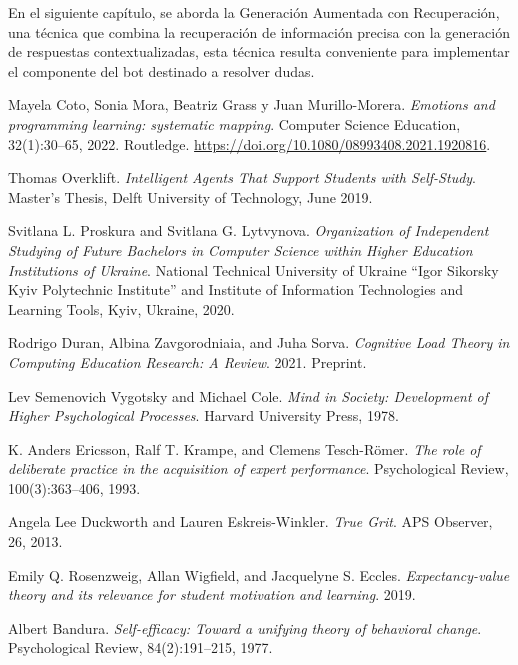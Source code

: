 \documentclass{article}
\begin{document}
En el siguiente capítulo, se aborda la Generación Aumentada con Recuperación, una técnica que combina la recuperación de información precisa con la generación de respuestas contextualizadas, esta técnica resulta conveniente para implementar el componente del bot destinado a resolver dudas.

\begin{thebibliography}{99}

Mayela Coto, Sonia Mora, Beatriz Grass y Juan Murillo-Morera. 
\textit{Emotions and programming learning: systematic mapping}. 
Computer Science Education, 32(1):30--65, 2022. 
Routledge. 
\url{https://doi.org/10.1080/08993408.2021.1920816}.

Thomas Overklift. 
\textit{Intelligent Agents That Support Students with Self-Study}. 
Master's Thesis, Delft University of Technology, June 2019.

Svitlana L. Proskura and Svitlana G. Lytvynova. 
\textit{Organization of Independent Studying of Future Bachelors in Computer Science within Higher Education Institutions of Ukraine}. 
National Technical University of Ukraine “Igor Sikorsky Kyiv Polytechnic Institute” and Institute of Information Technologies and Learning Tools, Kyiv, Ukraine, 2020.

Rodrigo Duran, Albina Zavgorodniaia, and Juha Sorva.
\textit{Cognitive Load Theory in Computing Education Research: A Review}.
2021. Preprint.

Lev Semenovich Vygotsky and Michael Cole.
\textit{Mind in Society: Development of Higher Psychological Processes}.
Harvard University Press, 1978.

K. Anders Ericsson, Ralf T. Krampe, and Clemens Tesch-R{\"o}mer.
\textit{The role of deliberate practice in the acquisition of expert performance}.
Psychological Review, 100(3):363--406, 1993.

Angela Lee Duckworth and Lauren Eskreis-Winkler.
\textit{True Grit}.
APS Observer, 26, 2013.

Emily Q. Rosenzweig, Allan Wigfield, and Jacquelyne S. Eccles.
\textit{Expectancy-value theory and its relevance for student motivation and learning}.
2019.

Albert Bandura.
\textit{Self-efficacy: Toward a unifying theory of behavioral change}.
Psychological Review, 84(2):191--215, 1977.


\end{thebibliography}
\end{document}
